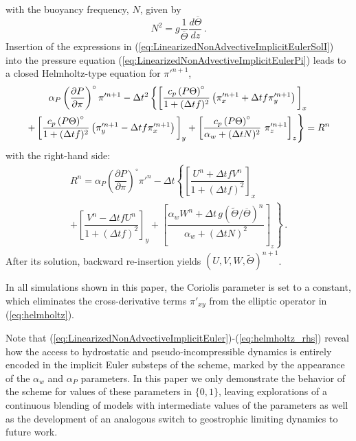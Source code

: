 \documentclass[12pt,a4paper]{article}
\theoremstyle{definition}
\newcommand{\eq}[1]{(\ref{#1})}
\newcommand{\dt}{\Delta t}
\newcommand{\Thetabar}{\overline{\Theta}}
\newcommand{\Thetatilde}{{\widetilde \Theta}}
\newcommand{\ahydro}{\alpha_{w}}
\newcommand{\apsinc}{\alpha_{P}}
\begin{document}
%
with the buoyancy frequency, $N$, given by
%
\begin{equation}
N^2 = g \frac{1}{\Thetabar}\frac{d\Thetabar}{dz}\,.
\end{equation}
%
Insertion of the expressions in \eq{eq:LinearizedNonAdvectiveImplicitEulerSolI}
into the pressure equation \eq{eq:LinearizedNonAdvectiveImplicitEulerPi} 
leads to a closed Helmholtz-type equation for ${\pi'}^{n+1}$, 
%
 \begin{multline}\label{eq:helmholtz}
 \apsinc \left(\dfrac{\partial P}{\partial\pi}\right)^{\circ}\pi'^{n+1} - \dt^2 
\left\{ 
      \left[
        \dfrac{c_p \left(P\Theta\right)^{\circ}}{1+(\dt f)^2} 
          \left(\pi'^{n+1}_x+\dt f\pi'^{n+1}_y
          \right)
        \rule{0pt}{12pt}\right]_x \right.\\
        \left.
       +\left[
          \dfrac{c_p \left(P\Theta\right)^{\circ}}{1+(\dt f)^2} 
            \left(\pi'^{n+1}_y-\dt f\pi'^{n+1}_x
            \right)
         \rule{0pt}{12pt}\right]_y
  + \left[\dfrac{c_p \left(P\Theta\right)^{\circ}}{\ahydro + (\dt N)^2} \ \pi'^{n+1}_z
      \rule{0pt}{12pt}\right]_z
    \right\}
  = R^n
 \end{multline}
%
with the right-hand side:
%
\begin{multline}\label{eq:helmholtz_rhs}
R^n= \apsinc \left(\dfrac{\partial P}{\partial\pi}\right)^{\circ}\pi'^n-
\dt
\left\{
\left[\dfrac{U^n +\dt f V^n}{1+(\dt f)^2}\right]_x\right.\\
\left.
+ \left[\dfrac{V^n - \dt f U^n}{1+(\dt f)^2}\right]_y
+\left[\dfrac{\ahydro W^n+\dt\, g\left(\Thetatilde/\Thetabar\right)^n}{\ahydro+(\dt N)^2}\right]_z\right\} \,.
\end{multline}
%
After its solution, backward re-insertion yields $(U, V, W, \Thetatilde)^{n+1}$.

In all simulations shown in this paper, the Coriolis parameter is set to a
constant, which eliminates the cross-derivative terms $\pi'_{xy}$ from
the elliptic operator in \eq{eq:helmholtz}.

Note that \eq{eq:LinearizedNonAdvectiveImplicitEuler}-\eq{eq:helmholtz_rhs}
reveal how the access to hydrostatic and pseudo-incompressible dynamics is entirely
encoded in the implicit Euler substeps of the scheme, marked by the appearance of 
the $\ahydro$ and $\apsinc$ parameters. In this paper we only demonstrate the behavior 
of the scheme for values of these parameters in $\{0,1\}$, leaving explorations of 
a continuous blending of models with intermediate values of the parameters as well as the development of an analogous switch to geostrophic limiting dynamics to future 
work.
\end{document}
